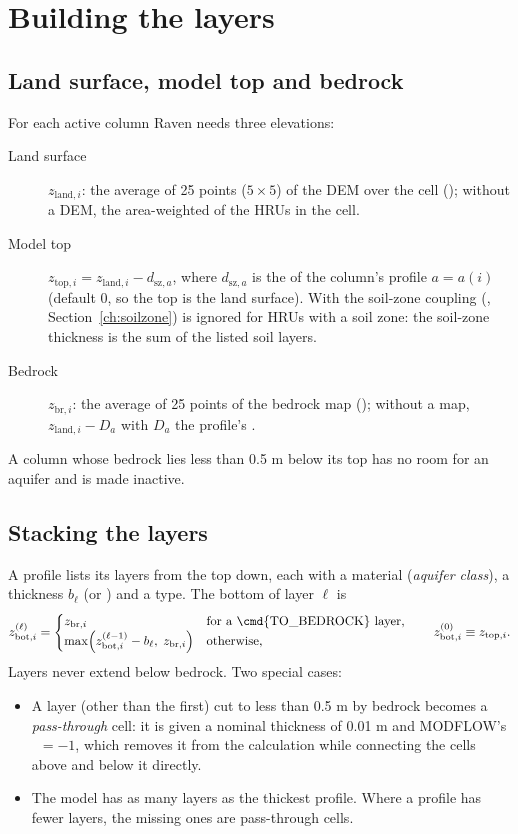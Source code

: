 \section{Building the layers}\label{ch:layers}
\subsection{Land surface, model top and bedrock}
For each active column Raven needs three elevations:
\begin{description}
\item[Land surface] $z_{\mathrm{land},i}$: the average of 25 points ($5\times5$) of the DEM over the cell
(); without a DEM, the area-weighted  of the HRUs in the cell.
\item[Model top] $z_{\mathrm{top},i}=z_{\mathrm{land},i}-d_{\mathrm{sz},a}$, where $d_{\mathrm{sz},a}$ is the
 of the column's profile $a=a(i)$ (default 0, so the top is the land surface). With the soil-zone
coupling (, Section~\ref{ch:soilzone})  is ignored for HRUs with a soil zone: the soil-zone thickness
is the sum of the listed soil layers.
\item[Bedrock] $z_{\mathrm{br},i}$: the average of 25 points of the bedrock map (); without a map,
$z_{\mathrm{land},i}-D_a$ with $D_a$ the profile's .
\end{description}
A column whose bedrock lies less than 0.5 m below its top has no room for an aquifer and is made inactive.

\subsection{Stacking the layers}
A profile lists its layers from the top down, each with a material (\emph{aquifer class}), a thickness $b_\ell$ (or
) and a type. The bottom of layer $\ell$ is
\begin{equation}
z^{(\ell)}_{\mathrm{bot},i}=
\begin{cases}
z_{\mathrm{br},i} & \text{for a \cmd{TO\_BEDROCK} layer,}\\
\max\!\left(z^{(\ell-1)}_{\mathrm{bot},i}-b_\ell,\;z_{\mathrm{br},i}\right) & \text{otherwise,}
\end{cases}
\qquad z^{(0)}_{\mathrm{bot},i}\equiv z_{\mathrm{top},i}.
\end{equation}
Layers never extend below bedrock. Two special cases:
\begin{itemize}
\item A layer (other than the first) cut to less than 0.5 m by bedrock becomes a \emph{pass-through} cell: it is given
a nominal thickness of 0.01 m and MODFLOW's ~$=-1$, which removes it from the calculation while
connecting the cells above and below it directly.
\item The model has as many layers as the thickest profile. Where a profile has fewer layers, the missing ones are
pass-through cells.
\end{itemize}

